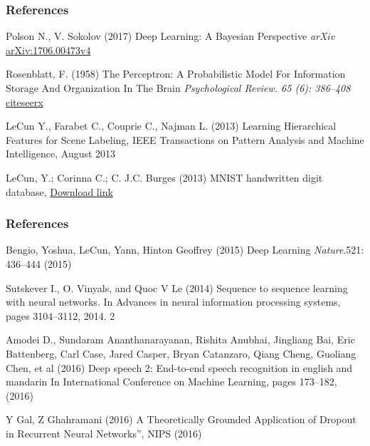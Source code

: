 \documentclass{beamer}
\begin{document}
\begin{frame}
\frametitle{References}
\footnotesize{
\begin{thebibliography}{99} 
 Polson N., V. Sokolov (2017)
\newblock Deep Learning: A Bayesian Perspective
\newblock \emph{arXiv} \href{https://arxiv.org/pdf/1706.00473}{arXiv:1706.00473v4}

 Rosenblatt, F. (1958)
\newblock The Perceptron: A Probabilistic Model For Information Storage And Organization In The Brain
\newblock \emph{Psychological Review. 65 (6): 386–408} \href{http://citeseerx.ist.psu.edu/viewdoc/download?doi=10.1.1.335.3398&rep=rep1&type=pdf}{citeseerx}

 LeCun Y., Farabet C., Couprie C., Najman L. (2013)
\newblock Learning Hierarchical Features for Scene Labeling, 
\newblock IEEE Transactions on Pattern Analysis and Machine Intelligence, August 2013

 LeCun, Y.; Corinna C.; C. J.C. Burges (2013)
\newblock MNIST handwritten digit database, 
\newblock \href{http://yann.lecun.com/exdb/mnist}{Download link}

\end{thebibliography}
}
\end{frame}

\begin{frame}
\frametitle{References}
\footnotesize{
\begin{thebibliography}{99} 
 Bengio, Yoshua, LeCun, Yann, Hinton Geoffrey (2015)
\newblock Deep Learning
\newblock \emph{Nature}.521: 436–444 (2015)

 Sutskever I., O. Vinyals, and Quoc V Le (2014)
\newblock Sequence to sequence learning with neural networks.
\newblock In Advances in neural information processing systems, pages 3104–3112, 2014. 2

Amodei D., Sundaram Ananthanarayanan, Rishita Anubhai, Jingliang Bai, Eric Battenberg, Carl Case, Jared Casper, Bryan Catanzaro, Qiang Cheng, Guoliang Chen, et al (2016)
\newblock Deep speech 2: End-to-end speech recognition in english and mandarin
\newblock In International Conference on Machine Learning, pages 173–182, (2016)

 Y Gal, Z Ghahramani (2016) 
\newblock A Theoretically Grounded Application of Dropout in
\newblock Recurrent Neural Networks”, NIPS (2016)


\end{thebibliography}
}
\end{frame}
\end{document}
